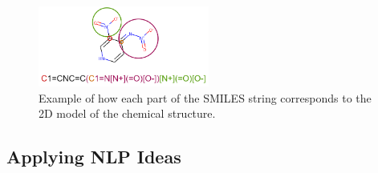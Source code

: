     \begin{figure}[h]
        \centering
        \includegraphics[width=0.5\textwidth]{figures/Smiles-Smile3.png}
        \caption{Example of how each part of the SMILES string corresponds to the 2D model of the chemical structure.}
        \label{fig:smile-examples2}
    \end{figure}
\subsection{Applying NLP Ideas}
